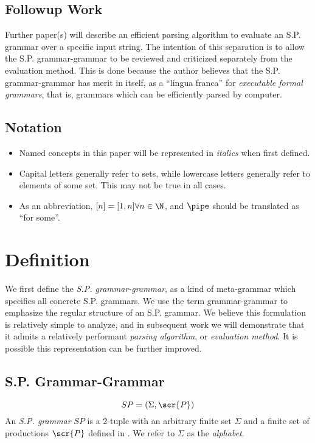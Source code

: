 \documentclass[10pt]{article}
\begin{document}
\subsection{Followup Work}
\label{sec:followup-work}
\noindent Further paper(s) will describe an efficient parsing algorithm to evaluate an S.P. grammar over a specific input string. The intention of this separation is to allow the S.P. grammar-grammar to be reviewed and criticized separately from the evaluation method. This is done because the author believes that the S.P. grammar-grammar has merit in itself, as a ``lingua franca'' for \textit{executable formal grammars}, that is, grammars which can be efficiently parsed by computer.

\subsection{Notation}
\label{sec:notation}
\begin{itemize}
  \item Named concepts in this paper will be represented in \textit{italics} when first defined.
  \item Capital letters generally refer to sets, while lowercase letters generally refer to elements of some set. This may not be true in all cases.
  \item As an abbreviation, $[n] = [1, n] \forall n \in \N$, and $\pipe$ should be translated as ``for some''.
\end{itemize}

\section{Definition}
\label{sec:definition}
We first define the \textit{S.P. grammar-grammar}, as a kind of meta-grammar which specifies all concrete S.P. grammars. We use the term grammar-grammar to emphasize the regular structure of an S.P. grammar. We believe this formulation is relatively simple to analyze, and in subsequent work we will demonstrate that it admits a relatively performant \textit{parsing algorithm}, or \textit{evaluation method}. It is possible this representation can be further improved.

\subsection{S.P. Grammar-Grammar}
\label{sec:grammar-grammar}

\begin{equation}
  \label{eq:sp}
  SP = (\Sigma, \scr{P})
\end{equation}
An \textit{S.P. grammar} $SP$ is a 2-tuple with an arbitrary finite set $\Sigma$ and a finite set of productions $\scr{P}$ defined in . We refer to $\Sigma$ as the \textit{alphabet}.
\end{document}
